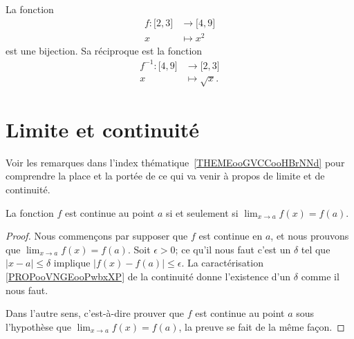 \begin{example}
	La fonction
	\begin{equation}
		\begin{aligned}
			f\colon \mathopen[ 2 , 3 \mathclose] & \to \mathopen[ 4 , 9 \mathclose] \\
			x                                    & \mapsto x^2
		\end{aligned}
	\end{equation}
	est une bijection. Sa réciproque est la fonction
	\begin{equation}
		\begin{aligned}
			f^{-1}\colon \mathopen[ 4 , 9 \mathclose] & \to \mathopen[ 2 , 3 \mathclose] \\
			x                                         & \mapsto \sqrt{x}.
		\end{aligned}
	\end{equation}
\end{example}

\section{Limite et continuité}
\label{SecLimiteFontion}

Voir les remarques dans l'index thématique~\ref{THEMEooGVCCooHBrNNd} pour comprendre la place et la portée de ce qui va venir à propos de limite et de continuité.

\begin{theorem}           \label{ThoLimCont}
	La fonction \( f\) est continue au point \( a\) si et seulement si \( \lim_{x\to a}f(x)=f(a)\).
\end{theorem}

\begin{proof}
    Nous commençons par supposer que \( f\) est continue en \( a\), et nous prouvons que \( \lim_{x\to a}f(x)=f(a)\). Soit \( \epsilon>0\); ce qu'il nous faut c'est un \( \delta\) tel que \( | x-a |\leq\delta\) implique \( | f(x)-f(a) |\leq\epsilon\). La caractérisation \ref{PROPooVNGEooPwbxXP} de la continuité donne l'existence d'un \( \delta\) comme il nous faut.

	Dans l'autre sens, c'est-à-dire prouver que \( f\) est continue au point \( a\) sous l'hypothèse que \( \lim_{x\to a}f(x)=f(a)\), la preuve se fait de la même façon.
\end{proof}

